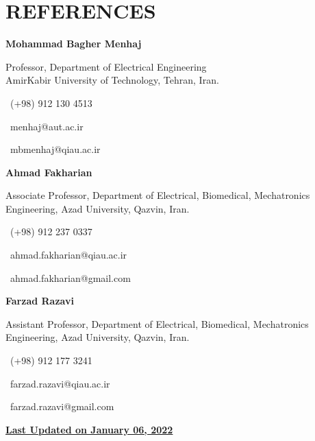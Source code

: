 \documentclass[10pt,a4paper,sans]{moderncv} %
\begin{document}
	\section{REFERENCES}
    \vspace{-1em}
    \begin{multicols}{3}
	        
	        \textbf{Mohammad Bagher Menhaj}
	        
	        Professor, Department of Electrical Engineering\\AmirKabir University of Technology, Tehran, Iran.
	        
	        {\faPhone \, (+98) 912 130 4513}
	        
	        {\faAt \, menhaj@aut.ac.ir}
	        
	        {\faAt \, mbmenhaj@qiau.ac.ir}
	        
	        \columnbreak
	        
	        \textbf{Ahmad Fakharian}
	        
	        Associate Professor, Department of Electrical, Biomedical, Mechatronics Engineering, Azad University, Qazvin, Iran.
	        
	        \faPhone \, (+98) 912 237 0337
	        
	        \faAt \, ahmad.fakharian@qiau.ac.ir
	        
	        \faAt \, ahmad.fakharian@gmail.com
	        
	        \columnbreak
	        
            \textbf{Farzad Razavi}
            
            Assistant Professor, Department of Electrical, Biomedical, Mechatronics Engineering, Azad University, Qazvin, Iran.
            
            \faPhone \, (+98) 912 177 3241
	        
	        \faAt \, farzad.razavi@qiau.ac.ir
	        
	        \faAt \, farzad.razavi@gmail.com
 
    \end{multicols}
	
    \vspace{6em}
	\centerline{\underline{\textbf{	\faExclamationCircle \hspace{0.5 pt} Last Updated on January 06, 2022}}}
\end{document}
